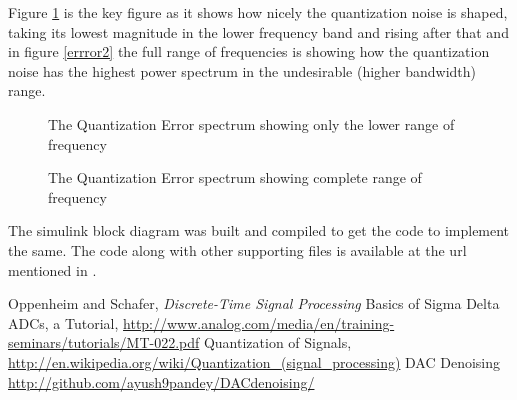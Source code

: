 \documentclass[colorlinks=true,pdfstartview=FitV,linkcolor=blue,
            citecolor=red,urlcolor=magenta]{ligodoc}
\begin{document}
Figure \ref{error1} is the key figure as it shows how nicely the quantization noise is shaped, taking its lowest magnitude in the lower frequency band and rising after that and in figure \ref{errror2} the full range of frequencies is showing how the quantization noise has the highest power spectrum in the undesirable (higher bandwidth) range. 
\begin{figure}[htbp]
 
  \centering
  
  \caption{The Quantization Error spectrum showing only the lower range of frequency}
 \label{error1}
\end{figure}

\begin{figure}[htbp]
 
  \centering
  
  \caption{The Quantization Error spectrum showing complete range of frequency}
 \label{error2}
\end{figure}



The simulink block diagram was built and compiled to get the code to implement the same. The code along with other supporting files is available at the url mentioned in \cite{Git}.

\begin{thebibliography}{5}  
 Oppenheim and Schafer, \emph{Discrete-Time Signal Processing}
 Basics of Sigma Delta ADCs, a Tutorial, \url{http://www.analog.com/media/en/training-seminars/tutorials/MT-022.pdf}
 Quantization of Signals, \url{http://en.wikipedia.org/wiki/Quantization_(signal_processing)}
 DAC Denoising \url{http://github.com/ayush9pandey/DACdenoising/}
\end{thebibliography}        
\end{document}
